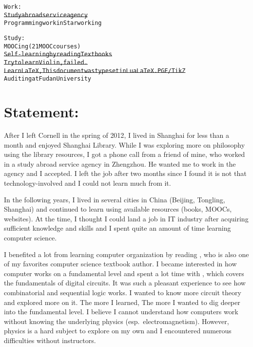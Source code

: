 


\usepackage[font={scriptsize,it}]{caption}
\usepackage{metalogo,alltt,soul,tikz,standalone,wrapfig,csquotes}
\usetikzlibrary{calc}
\usepackage{biblatex} %



\newcommand*{\onum}[1]{{\addfontfeatures{Numbers=OldStyle}#1}}
\newcommand*{\TikZ}{PGF/\kern1bpTi\kern.5bp\textit{k}Z}


	\begin{alltt}
		Work:
		\st{Study abroad service agency}
		Programming work in Starworking
		
		Study:
		MOOCing (21 MOOC courses)
		\st{Self-learning by reading Textbooks}
		\st{Try to learn Violin, failed.}
		\st{Learn LaTeX, This document was typeset in LuaLaTeX. PGF/TikZ}
		Auditing at Fudan University
	\end{alltt}
	
	\section*{Statement:}
	After I left Cornell in the spring of \onum{2012}, I lived in Shanghai for less
	than a month and enjoyed Shanghai Library. While I was exploring more on
	philosophy using the library resources, I got a phone call from a friend of
	mine, who worked in a study abroad service agency in Zhengzhou. He wanted me to
	work in the agency and I accepted. I left the job after two months since I
	found it is not that technology-involved and I could not learn much from it.
	
	In the following years, I lived in several cities in China (Beijing, Tongling,
	Shanghai) and continued to learn using available resources (books, MOOCs,
	websites). At the time, I thought I could land a job in IT industry after
	acquiring sufficient knowledge and skills and I spent quite an amount of time
	learning computer science.
	
	I benefited a lot from learning computer organization by reading
	\textcite{COA8e}, who is also one of my favorites computer science textbook
	author. I became interested in how computer works on a fundamental level and
	spent a lot time with \textcite{LCDF}, which covers the fundamentals of digital
	circuits. It was such a pleasant experience to see how combinatorial and
	sequential logic works. I wanted to know more circuit theory and explored more
	on it. The more I learned, The more I wanted to dig deeper into the fundamental
	level. I believe I cannot understand how computers work without knowing the
	underlying physics (esp.\ electromagnetism). However, physics is a hard subject
	to explore on my own and I encountered numerous difficulties without
	instructors.
	
